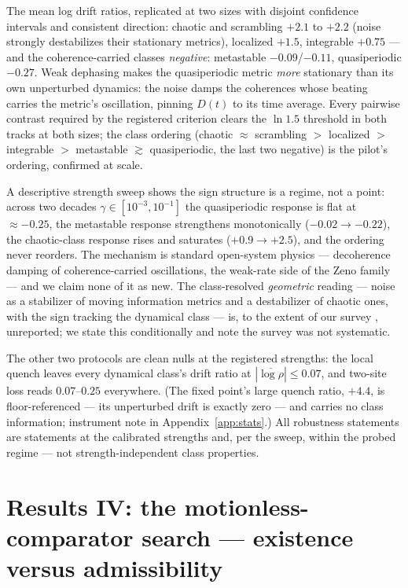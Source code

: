 \documentclass[a4paper,11pt,noarxiv]{quantumarticle}
\newcommand{\logr}{\log\rho}
\begin{document}
The mean log drift ratios, replicated at two sizes with disjoint
confidence intervals and consistent direction: chaotic and scrambling
$+2.1$ to $+2.2$ (noise strongly destabilizes their stationary
metrics), localized $+1.5$, integrable $+0.75$ --- and the
coherence-carried classes \emph{negative}: metastable
$-0.09$/$-0.11$, quasiperiodic $-0.27$. Weak dephasing makes the
quasiperiodic metric \emph{more} stationary than its own unperturbed
dynamics: the noise damps the coherences whose beating carries the
metric's oscillation, pinning $D(t)$ to its time average. Every
pairwise contrast required by the registered criterion clears the
$\ln 1.5$ threshold in both tracks at both sizes; the class ordering
(chaotic $\approx$ scrambling $>$ localized $>$ integrable $>$
metastable $\gtrsim$ quasiperiodic, the last two negative) is the
pilot's ordering, confirmed at scale.

A descriptive strength sweep shows the sign structure is a regime, not
a point: across two decades $\gamma \in [10^{-3}, 10^{-1}]$ the
quasiperiodic response is flat at $\approx -0.25$, the metastable
response strengthens monotonically ($-0.02 \to -0.22$), the
chaotic-class response rises and saturates ($+0.9 \to +2.5$), and the
ordering never reorders. The mechanism is standard open-system physics
--- decoherence damping of coherence-carried oscillations, the
weak-rate side of the Zeno family \cite{SRC059} --- and we claim none
of it as new. The class-resolved \emph{geometric} reading --- noise as
a stabilizer of moving information metrics and a destabilizer of
chaotic ones, with the sign tracking the dynamical class --- is, to the
extent of our survey \cite{SRC060,SRC061,SRC062,SRC063}, unreported;
we state this conditionally and note the survey was not systematic.

The other two protocols are clean nulls at the registered strengths:
the local quench leaves every dynamical class's drift ratio at
$|\overline{\logr}| \leq 0.07$, and two-site loss reads $0.07$--$0.25$
everywhere. (The fixed point's large quench ratio, $+4.4$, is
floor-referenced --- its unperturbed drift is exactly zero --- and
carries no class information; instrument note in
Appendix~\ref{app:stats}.) All robustness statements are statements at
the calibrated strengths and, per the sweep, within the probed regime
--- not strength-independent class properties.

\section{Results IV: the motionless-comparator search --- existence
versus admissibility}\label{sec:comparator}
\end{document}
